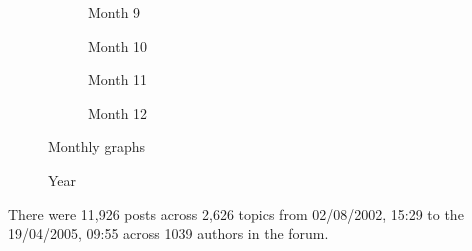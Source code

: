 \begin{figure}[htbp]
	\vspace{0.25cm}

	\begin{subfigure}[b]{0.24\textwidth}
		
		\caption{Month 9}
		\label{fig:month9}
	\end{subfigure}
	\hfill
	\begin{subfigure}[b]{0.24\textwidth}
		
		\caption{Month 10}
		\label{fig:month10}
	\end{subfigure}
	\hfill
	\begin{subfigure}[b]{0.24\textwidth}
		
		\caption{Month 11}
		\label{fig:month11}
	\end{subfigure}
	\hfill
	\begin{subfigure}[b]{0.24\textwidth}
		
		\caption{Month 12}
		\label{fig:month12}
	\end{subfigure}

	\caption{Monthly graphs}
	\label{fig:monthlyGraphs}
\end{figure}


\begin{figure}[h!]
	\centering
	
	\caption{Year}
	\label{figure:year}
\end{figure}


%

%

%

%


There were 11,926 posts across 2,626 topics from 02/08/2002, 15:29 to the 19/04/2005, 09:55 across 1039 authors in the forum.


